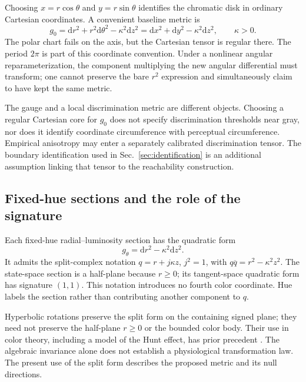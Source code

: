\documentclass[9pt,twocolumn,twoside]{opticajnl}
\theoremstyle{plain}
\newcommand{\dd}{\mathrm{d}}
\begin{document}
Choosing $x=r\cos\theta$ and $y=r\sin\theta$ identifies the chromatic disk in ordinary Cartesian coordinates. A convenient baseline metric is
\begin{equation}
 g_0=\dd r^2+r^2\dd\theta^2-\kappa^2\dd z^2
     =\dd x^2+\dd y^2-\kappa^2\dd z^2,
 \qquad\kappa>0.
 \label{eq:baseline}
\end{equation}
The polar chart fails on the axis, but the Cartesian tensor is regular there. The period $2\pi$ is part of this coordinate convention. Under a nonlinear angular reparameterization, the component multiplying the new angular differential must transform; one cannot preserve the bare $r^2$ expression and simultaneously claim to have kept the same metric.

The gauge and a local discrimination metric are different objects. Choosing a regular Cartesian core for $g_0$ does not specify discrimination thresholds near gray, nor does it identify coordinate circumference with perceptual circumference. Empirical anisotropy may enter a separately calibrated discrimination tensor. The boundary identification used in Sec.~\ref{sec:identification} is an additional assumption linking that tensor to the reachability construction.

\subsection{Fixed-hue sections and the role of the signature}
Each fixed-hue radial--luminosity section has the quadratic form
\begin{equation}
 g_\theta=\dd r^2-\kappa^2\dd z^2.
 \label{eq:section-metric}
\end{equation}
It admits the split-complex notation $q=r+j\kappa z$, $j^2=1$, with $q\overline q=r^2-\kappa^2z^2$. The state-space section is a half-plane because $r\geq0$; its tangent-space quadratic form has signature $(1,1)$. This notation introduces no fourth color coordinate. Hue labels the section rather than contributing another component to $q$.

Hyperbolic rotations preserve the split form on the containing signed plane; they need not preserve the half-plane $r\geq0$ or the bounded color body. Their use in color theory, including a model of the Hunt effect, has prior precedent \cite{BerthierProvenzi2022}. The algebraic invariance alone does not establish a physiological transformation law. The present use of the split form describes the proposed metric and its null directions.
\end{document}
